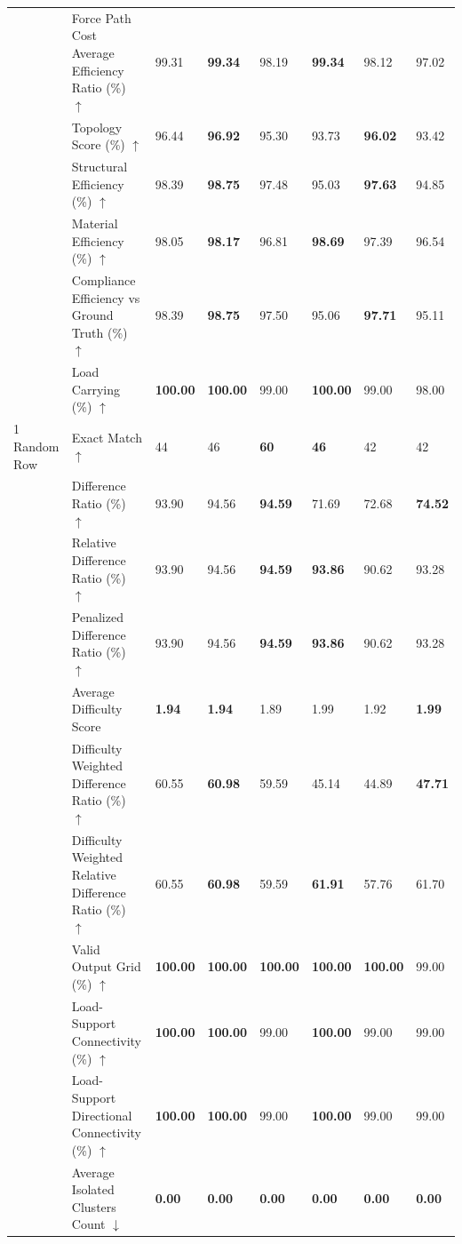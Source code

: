 \begin{table}[!h]
{\begin{tabular}{lllll|lll}
 & Force Path Cost Average Efficiency Ratio (\%) $\uparrow$ & 99.31 & \textbf{99.34} & 98.19 & \textbf{99.34} & 98.12 & 97.02 \\
 & Topology Score (\%) $\uparrow$ & 96.44 & \textbf{96.92} & 95.30 & 93.73 & \textbf{96.02} & 93.42 \\
 & Structural Efficiency (\%) $\uparrow$ & 98.39 & \textbf{98.75} & 97.48 & 95.03 & \textbf{97.63} & 94.85 \\
 & Material Efficiency (\%) $\uparrow$ & 98.05 & \textbf{98.17} & 96.81 & \textbf{98.69} & 97.39 & 96.54 \\
 & Compliance Efficiency vs Ground Truth (\%) $\uparrow$ & 98.39 & \textbf{98.75} & 97.50 & 95.06 & \textbf{97.71} & 95.11 \\
 & Load Carrying (\%) $\uparrow$ & \textbf{100.00} & \textbf{100.00} & 99.00 & \textbf{100.00} & 99.00 & 98.00 \\
\midrule
1 Random Row & Exact Match $\uparrow$ & 44 & 46 & \textbf{60} & \textbf{46} & 42 & 42 \\
 & Difference Ratio (\%) $\uparrow$ & 93.90 & 94.56 & \textbf{94.59} & 71.69 & 72.68 & \textbf{74.52} \\
 & Relative Difference Ratio (\%) $\uparrow$ & 93.90 & 94.56 & \textbf{94.59} & \textbf{93.86} & 90.62 & 93.28 \\
 & Penalized Difference Ratio (\%) $\uparrow$ & 93.90 & 94.56 & \textbf{94.59} & \textbf{93.86} & 90.62 & 93.28 \\
 & Average Difficulty Score & \textbf{1.94} & \textbf{1.94} & 1.89 & 1.99 & 1.92 & \textbf{1.99} \\
 & Difficulty Weighted Difference Ratio (\%) $\uparrow$ & 60.55 & \textbf{60.98} & 59.59 & 45.14 & 44.89 & \textbf{47.71} \\
 & Difficulty Weighted Relative Difference Ratio (\%) $\uparrow$ & 60.55 & \textbf{60.98} & 59.59 & \textbf{61.91} & 57.76 & 61.70 \\
 & Valid Output Grid (\%) $\uparrow$ & \textbf{100.00} & \textbf{100.00} & \textbf{100.00} & \textbf{100.00} & \textbf{100.00} & 99.00 \\
 & Load-Support Connectivity (\%) $\uparrow$ & \textbf{100.00} & \textbf{100.00} & 99.00 & \textbf{100.00} & 99.00 & 99.00 \\
 & Load-Support Directional Connectivity (\%) $\uparrow$ & \textbf{100.00} & \textbf{100.00} & 99.00 & \textbf{100.00} & 99.00 & 99.00 \\
 & Average Isolated Clusters Count $\downarrow$ & \textbf{0.00} & \textbf{0.00} & \textbf{0.00} & \textbf{0.00} & \textbf{0.00} & \textbf{0.00} \\

\end{tabular}}
\end{table}
